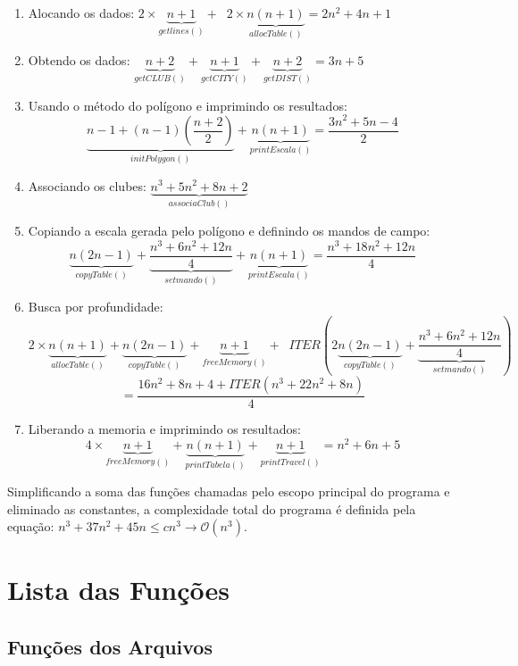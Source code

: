 \documentclass[12pt,a4paper]{article}
\numberwithin{figure}{section}
\numberwithin{table}{section}
\begin{document}
\begin{enumerate}
\setlength\itemsep{1pt}
	\item Alocando os dados: $ 2 \times \underbrace{n+1}_{getlines()} + \;\; 2 \times \underbrace{n(n+1)}_{allocTable()} = 2n^2 + 4n +1 $
	
	\item Obtendo os dados: $ \underbrace{n+2}_{getCLUB()} + \underbrace{n+1}_{getCITY()} + \underbrace{n+2}_{getDIST()} = 3n + 5 $
	
	\item Usando o método do polígono e imprimindo os resultados: \[ \underbrace{n-1 + (n-1)(\frac{n+2}{2})}_{initPolygon()} + \underbrace{n(n+1)}_{printEscala()} = \frac{3n^2 + 5n -4}{2} \]
	
	\item Associando os clubes: $ \underbrace{n^3 + 5n^2 + 8n + 2}_{associaClub()} $
	
	\item Copiando a escala gerada pelo polígono e definindo os mandos de campo: \[ \underbrace{n(2n-1)}_{copyTable()} + \underbrace{\frac{n^3 + 6n^2 + 12n}{4}}_{setmando()} + \underbrace{n(n+1)}_{printEscala()} = \frac{n^3 + 18n^2 + 12n}{4} \]
	
	\item Busca por profundidade: \[ 2 \times \underbrace{n(n+1)}_{allocTable()} + \underbrace{n(2n-1)}_{copyTable()} + \underbrace{n+1}_{freeMemory()} + \;\; ITER(2\underbrace{n(2n-1)}_{copyTable()} + \underbrace{\frac{n^3 + 6n^2 + 12n}{4}}_{setmando()}) \] \[ = \frac{16n^2 + 8n + 4 + ITER(n^3 + 22n^2 + 8n)}{4} \]
	
	\item Liberando a memoria e imprimindo os resultados: \[ 4 \times \underbrace{n+1}_{freeMemory()} + \underbrace{n(n+1)}_{printTabela()} + \underbrace{n+1}_{printTravel()} = n^2 + 6n + 5 \]
\end{enumerate}

Simplificando a soma das funções chamadas pelo escopo principal do programa e eliminado as constantes, a complexidade total do programa é definida pela equação: $ n^3 + 37n^2 + 45n \leqslant cn^3 \rightarrow \mathcal{O}(n^3) $.

\section{Lista das Funções}

\subsection{Funções dos Arquivos}
\end{document}
